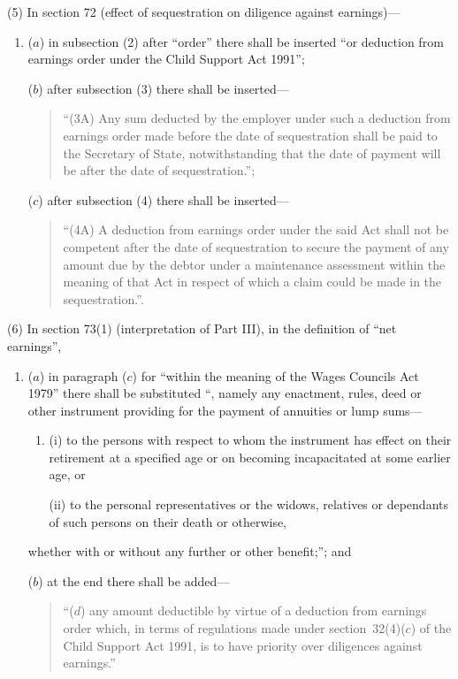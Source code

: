 \documentclass[12pt,a4paper]{article}
\begin{document}
(5) In section 72 (effect of sequestration on diligence against earnings)—
\begin{enumerate}\item[]
($a$) in subsection (2)  after “order” there shall be inserted “or deduction from earnings order under the Child Support Act 1991”;

($b$) after subsection (3)  there shall be inserted—
\begin{quotation}
“(3A) Any sum deducted by the employer under such a deduction from earnings order made before the date of sequestration shall be paid to the Secretary of State, notwithstanding that the date of payment will be after the date of sequestration.”;
\end{quotation}

($c$) after subsection (4)  there shall be inserted—
\begin{quotation}
“(4A) A deduction from earnings order under the said Act shall not be competent after the date of sequestration to secure the payment of any amount due by the debtor under a maintenance assessment within the meaning of that Act in respect of which a claim could be made in the sequestration.”.
\end{quotation}
\end{enumerate}

(6) In section 73(1)  (interpretation of Part III), in the definition of “net earnings”,
\begin{enumerate}\item[]
($a$) in paragraph ($c$)  for “within the meaning of the Wages Councils Act 1979” there shall be substituted “, namely any enactment, rules, deed or other instrument providing for the payment of annuities or lump sums—
\begin{enumerate}\item[]
(i) to the persons with respect to whom the instrument has effect on their retirement at a specified age or on becoming incapacitated at some earlier age, or

(ii) to the personal representatives or the widows, relatives or dependants of such persons on their death or otherwise,
\end{enumerate}
whether with or without any further or other benefit;”; and

($b$) at the end there shall be added—
\begin{quotation}
“($d$) any amount deductible by virtue of a deduction from earnings order which, in terms of regulations made under section~32(4)($c$)  of the Child Support Act 1991, is to have priority over diligences against earnings.”
\end{quotation}
\end{enumerate}
\end{document}
